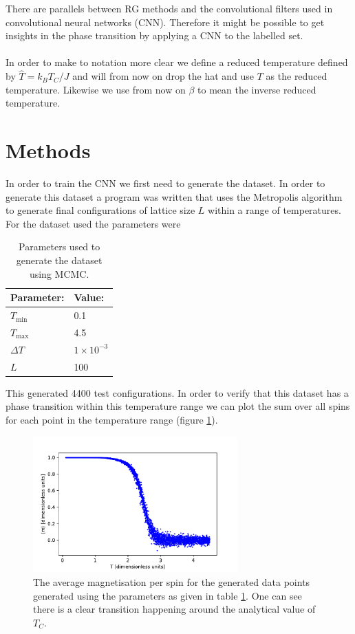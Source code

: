 \documentclass[10 pt, a4paper]{article}
\begin{document}
There are parallels between RG methods and the convolutional filters used in convolutional neural networks (CNN). Therefore it might be possible to get insights in the phase transition by applying a CNN to the labelled set. 
\\
\\
In order to make to notation more clear we define a reduced temperature defined by $\hat{T} = k_B T_C / J$ and will from now on drop the hat and use $T$ as the reduced temperature. Likewise we use from now on $\beta$ to mean the inverse reduced temperature.

\section{Methods}

In order to train the CNN we first need to generate the dataset. In order to generate this dataset a program was written that uses the Metropolis algorithm to generate final configurations of lattice size $L$ within a range of temperatures. For the dataset used the parameters were

\begin{table}[H]
\centering
\caption{Parameters used to generate the dataset using MCMC. \label{tab:params}}
\begin{tabular}{l|l}
Parameter: & Value:                                           \\ \hline
$T_\mathrm{min}$ & 0.1                       \\
$T_\mathrm{max}$ & 4.5  \\
$\Delta T$        & $1 \times 10^{-3}$ \\                           
$L$        & 100                           \\
\end{tabular}
\end{table} 

This generated 4400 test configurations. In order to verify that this dataset has a phase transition within this temperature range we can plot the sum over all spins for each point in the temperature range (figure \ref{fig:mags}).

\begin{figure}[H] 
\centering
\includegraphics[width=0.7\textwidth]{mag}
\caption{The average magnetisation per spin for the generated data points generated using the parameters as given in table \ref{tab:params}. One can see there is a clear transition happening around the analytical value of $T_C$. \label{fig:mags}}
\end{figure}
\end{document}
